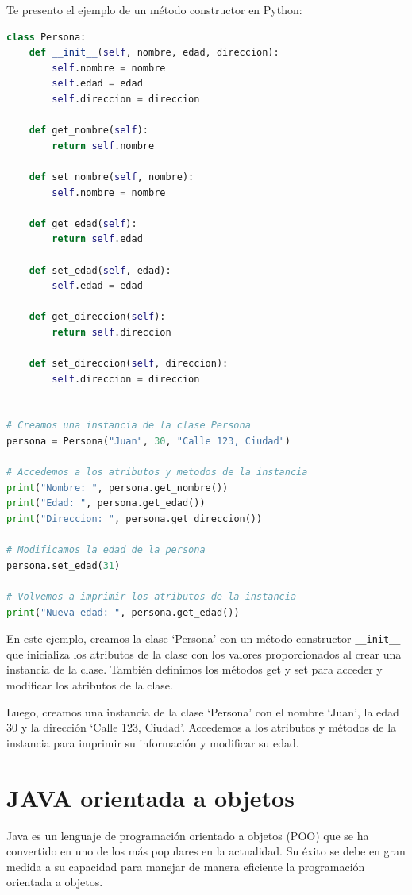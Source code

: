 \documentclass[executivepaper]{article}
\begin{document}
Te presento el ejemplo de un método constructor en Python:
\begin{lstlisting}[language=Python]
class Persona:
    def __init__(self, nombre, edad, direccion):
        self.nombre = nombre
        self.edad = edad
        self.direccion = direccion

    def get_nombre(self):
        return self.nombre

    def set_nombre(self, nombre):
        self.nombre = nombre

    def get_edad(self):
        return self.edad

    def set_edad(self, edad):
        self.edad = edad

    def get_direccion(self):
        return self.direccion

    def set_direccion(self, direccion):
        self.direccion = direccion


# Creamos una instancia de la clase Persona
persona = Persona("Juan", 30, "Calle 123, Ciudad")

# Accedemos a los atributos y metodos de la instancia
print("Nombre: ", persona.get_nombre())
print("Edad: ", persona.get_edad())
print("Direccion: ", persona.get_direccion())

# Modificamos la edad de la persona
persona.set_edad(31)

# Volvemos a imprimir los atributos de la instancia
print("Nueva edad: ", persona.get_edad())
\end{lstlisting}
En este ejemplo, creamos la clase \enquote*{Persona} con un método constructor \lstinline{__init__} que inicializa los atributos de la clase con los valores proporcionados al crear una instancia de la clase. También definimos los métodos get y set para acceder y modificar los atributos de la clase.

Luego, creamos una instancia de la clase \enquote*{Persona} con el nombre \enquote*{Juan}, la edad 30 y la dirección \enquote*{Calle 123, Ciudad}. Accedemos a los atributos y métodos de la instancia para imprimir su información y modificar su edad.

\newpage
\section{JAVA orientada a objetos}
Java es un lenguaje de programación orientado a objetos (POO) que se ha convertido en uno de los más populares en la actualidad. Su éxito se debe en gran medida a su capacidad para manejar de manera eficiente la programación orientada a objetos. 
\end{document}
